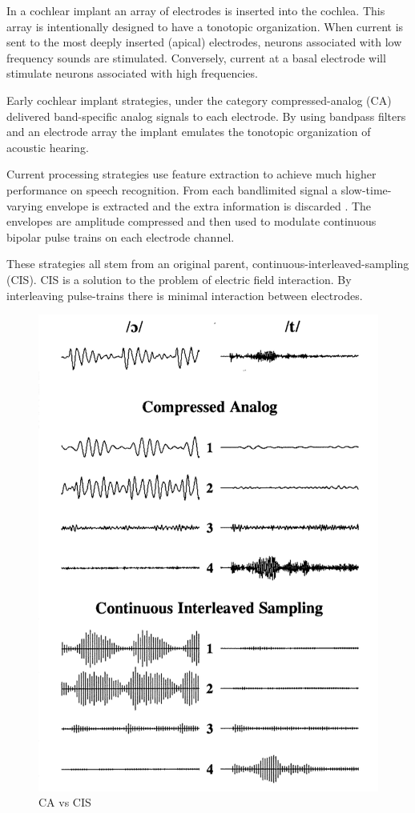 \documentclass [11pt, proquest,oneside] {ganter_thesis}[2015/03/03]
\begin{document}

In a cochlear implant an array of electrodes is inserted into the cochlea.  This array is intentionally designed to have a tonotopic organization.  When current is sent to the most deeply inserted (apical) electrodes, neurons associated with low frequency sounds are stimulated.  Conversely, current at a basal electrode will stimulate neurons associated with high frequencies.

Early cochlear implant strategies, under the category compressed-analog (CA) delivered band-specific analog signals to each electrode.  By using bandpass filters and an electrode array the implant emulates the tonotopic organization of acoustic hearing.

Current processing strategies use feature extraction to achieve much higher performance on speech recognition.  From each bandlimited signal a slow-time-varying envelope is extracted and the extra information is discarded \cite{vandali2005pitch}.  The envelopes are amplitude compressed and then used to modulate continuous bipolar pulse trains on each electrode channel.

These strategies all stem from an original parent, continuous-interleaved-sampling (CIS).  CIS is a solution to the problem of electric field interaction.  By interleaving pulse-trains there is minimal interaction between electrodes.


\begin{figure}[!ht]
  \centering
    \includegraphics[width=.5\textwidth]{caVScis}   
    \caption{CA vs CIS}
\end{figure}
\end{document}
